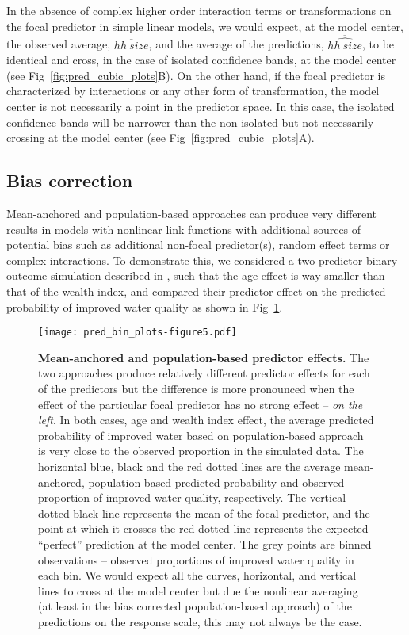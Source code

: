 \documentclass[10pt,letterpaper]{article}
\let\over=\overline
\begin{document}
In the absence of complex higher order interaction terms or transformations on the focal predictor in simple linear models, we would expect, at the model center, the observed average, $\over{hh~size}$, and the average of the predictions, $\over{\widehat{hh~size}}$, to be identical and cross, in the case of isolated confidence bands, at the model center (see Fig~\ref{fig:pred_cubic_plots}B). On the other hand, if the focal predictor is characterized by interactions or any other form of transformation, the model center is not necessarily a point in the predictor space. In this case, the isolated confidence bands will be narrower than the non-isolated but not necessarily crossing at the model center (see Fig~\ref{fig:pred_cubic_plots}A).

\subsection*{Bias correction}

Mean-anchored and population-based approaches can produce very different results in models with nonlinear link functions with additional sources of potential bias such as additional non-focal predictor(s), random effect terms or complex interactions. To demonstrate this, we considered a two predictor binary outcome simulation described in , such that the age effect is way smaller than that of the wealth index, and compared their predictor effect on the predicted probability of improved water quality as shown in Fig~\ref{fig:pred_bin_plots}. 

\begin{figure}[!h]
\centering
\texttt{[image: pred\_bin\_plots-figure5.pdf]}
\caption{{\bf Mean-anchored and population-based predictor effects.} The two approaches produce relatively different predictor effects for each of the predictors but the difference is more pronounced when the effect of the particular focal predictor has no strong effect -- \emph{on the left}. In both cases, age and wealth index effect, the average predicted probability of improved water based on population-based approach is very close to the observed proportion in the simulated data. The horizontal blue, black and the red dotted lines are the average mean-anchored, population-based predicted probability and observed proportion of improved water quality, respectively. The vertical dotted black line represents the mean of the focal predictor, and the point at which it crosses the red dotted line represents the expected ``perfect'' prediction at the model center. The grey points are binned observations -- observed proportions of improved water quality in each bin. We would expect all the curves, horizontal, and vertical lines to cross at the model center but due the nonlinear averaging (at least in the bias corrected population-based approach) of the predictions on the response scale, this may not always be the case.} 
\label{fig:pred_bin_plots}
\end{figure}
\end{document}
